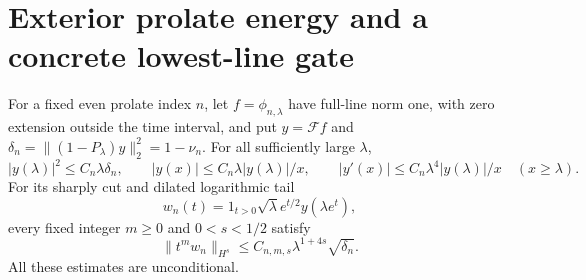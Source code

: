 \section{Exterior prolate energy and a concrete lowest-line gate}
\label{sec:spectral-prolate-exterior}

\begin{lemma}
\label{AC-S31}
For a fixed even prolate index $n$, let $f=\phi_{n,\lambda}$
have full-line norm one, with zero extension outside the
time interval, and put $y=\mathcal Ff$ and
$\delta_n=\|(1-P_\lambda)y\|_2^2=1-\nu_n$.
For all sufficiently large $\lambda$,
\[
 |y(\lambda)|^2\leq C_n\lambda\delta_n,
 \qquad
 |y(x)|\leq C_n\lambda|y(\lambda)|/x,
 \qquad
 |y'(x)|\leq C_n\lambda^4|y(\lambda)|/x
                    \quad(x\geq\lambda).           \tag{SE.1}
\]
For its sharply cut and dilated logarithmic tail
\[
 w_n(t)=1_{t>0}\sqrt\lambda e^{t/2}y(\lambda e^t),
\]
every fixed integer $m\geq0$ and $0<s<1/2$ satisfy
\[
             \|t^mw_n\|_{H^s}
                    \leq C_{n,m,s}\lambda^{1+4s}\sqrt{\delta_n}.
                                                        \tag{SE.2}
\]
All these estimates are unconditional.
\end{lemma}
